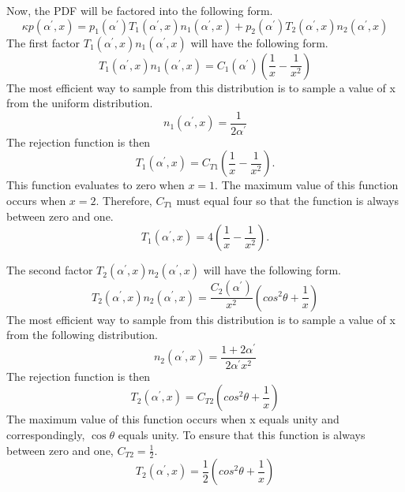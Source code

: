Now, the PDF will be factored into the following form.
\begin{equation*}
  \kappa p(\alpha^{'},x) = p_1(\alpha^{'})T_1(\alpha^{'},x)n_1(\alpha^{'},x) + 
  p_2(\alpha^{'})T_2(\alpha^{'},x)n_2(\alpha^{'},x)
\end{equation*}
The first factor $T_1(\alpha^{'},x)n_1(\alpha^{'},x)$ will have the following 
form.
\begin{equation*}
  T_1(\alpha^{'},x)n_1(\alpha^{'},x) = C_1(\alpha^{'})\left(\frac{1}{x} - 
  \frac{1}{x^2}\right)
\end{equation*}
The most efficient way to sample from this distribution is to sample a value
of x from the uniform distribution.
\begin{equation}
  n_1(\alpha^{'},x) = \frac{1}{2\alpha^{'}}
\end{equation}
The rejection function is then
\begin{equation*}
  T_1(\alpha^{'},x) = C_{T1}\left(\frac{1}{x} - \frac{1}{x^2}\right).
\end{equation*}
This function evaluates to zero when $x = 1$. The maximum value of this function
occurs when $x = 2$. Therefore, $C_{T1}$ must equal four so that the function
is always between zero and one.
\begin{equation}
  T_1(\alpha^{'},x) = 4\left(\frac{1}{x} - \frac{1}{x^2}\right).
\end{equation}

The second factor $T_2(\alpha^{'},x)n_2(\alpha^{'},x)$ will have the following 
form.
\begin{equation*}
  T_2(\alpha^{'},x)n_2(\alpha^{'},x) = \frac{C_2(\alpha^{'})}{x^2}
  \left(cos^2\theta + \frac{1}{x}\right)
\end{equation*}
The most efficient way to sample from this distribution is to sample a value
of x from the following distribution.
\begin{equation}
  n_2(\alpha^{'},x) = \frac{1+2\alpha^{'}}{2\alpha^{'} x^2}
\end{equation}
The rejection function is then
\begin{equation*}
  T_2(\alpha^{'},x) = C_{T2}\left(cos^2\theta + \frac{1}{x} \right)
\end{equation*}
The maximum value of this function occurs when x equals unity and 
correspondingly, $\cos{\theta}$ equals unity. To ensure that this function is
always between zero and one, $C_{T2} = \frac{1}{2}$.
\begin{equation}
  T_2(\alpha^{'},x) = \frac{1}{2}\left(cos^2\theta + \frac{1}{x} \right)
\end{equation}

